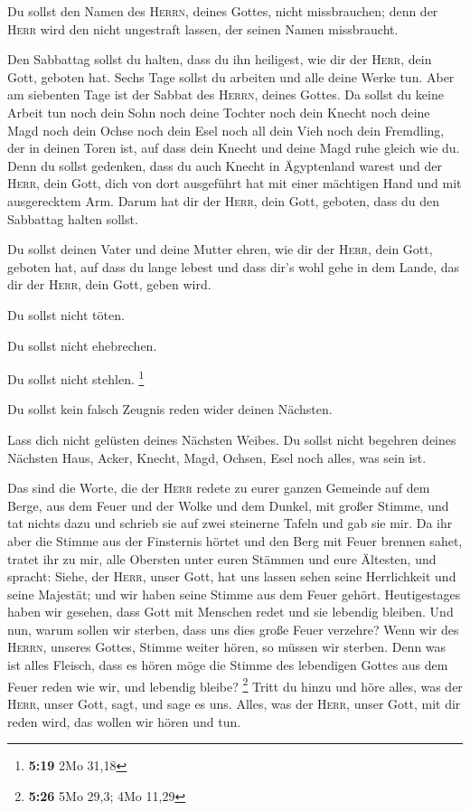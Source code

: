  Du sollst den Namen des \textsc{Herrn}, deines Gottes,
nicht missbrauchen; denn der \textsc{Herr} wird den nicht ungestraft
lassen, der seinen Namen missbraucht.

 Den Sabbattag sollst du halten, dass du ihn heiligest,
wie dir der \textsc{Herr}, dein Gott, geboten hat.  Sechs
Tage sollst du arbeiten und alle deine Werke tun.  Aber
am siebenten Tage ist der Sabbat des \textsc{Herrn}, deines Gottes. Da
sollst du keine Arbeit tun noch dein Sohn noch deine Tochter noch dein
Knecht noch deine Magd noch dein Ochse noch dein Esel noch all dein Vieh
noch dein Fremdling, der in deinen Toren ist, auf dass dein Knecht und
deine Magd ruhe gleich wie du.  Denn du sollst gedenken,
dass du auch Knecht in Ägyptenland warest und der \textsc{Herr}, dein
Gott, dich von dort ausgeführt hat mit einer mächtigen Hand und mit
ausgerecktem Arm. Darum hat dir der \textsc{Herr}, dein Gott, geboten,
dass du den Sabbattag halten sollst.

 Du sollst deinen Vater und deine Mutter ehren, wie dir
der \textsc{Herr}, dein Gott, geboten hat, auf dass du lange lebest und
dass dir's wohl gehe in dem Lande, das dir der \textsc{Herr}, dein Gott,
geben wird.

 Du sollst nicht töten.

 Du sollst nicht ehebrechen.

 Du sollst nicht stehlen. \footnote{\textbf{5:19} 2Mo
  31,18}

 Du sollst kein falsch Zeugnis reden wider deinen
Nächsten.

 Lass dich nicht gelüsten deines Nächsten Weibes. Du
sollst nicht begehren deines Nächsten Haus, Acker, Knecht, Magd, Ochsen,
Esel noch alles, was sein ist.

 Das sind die Worte, die der \textsc{Herr} redete zu
eurer ganzen Gemeinde auf dem Berge, aus dem Feuer und der Wolke und dem
Dunkel, mit großer Stimme, und tat nichts dazu und schrieb sie auf zwei
steinerne Tafeln und gab sie mir.  Da ihr aber die Stimme
aus der Finsternis hörtet und den Berg mit Feuer brennen sahet, tratet
ihr zu mir, alle Obersten unter euren Stämmen und eure Ältesten,
 und spracht: Siehe, der \textsc{Herr}, unser Gott, hat
uns lassen sehen seine Herrlichkeit und seine Majestät; und wir haben
seine Stimme aus dem Feuer gehört. Heutigestages haben wir gesehen, dass
Gott mit Menschen redet und sie lebendig bleiben.  Und
nun, warum sollen wir sterben, dass uns dies große Feuer verzehre? Wenn
wir des \textsc{Herrn}, unseres Gottes, Stimme weiter hören, so müssen
wir sterben.  Denn was ist alles Fleisch, dass es hören
möge die Stimme des lebendigen Gottes aus dem Feuer reden wie wir, und
lebendig bleibe? \footnote{\textbf{5:26} 5Mo 29,3; 4Mo 11,29}
 Tritt du hinzu und höre alles, was der \textsc{Herr},
unser Gott, sagt, und sage es uns. Alles, was der \textsc{Herr}, unser
Gott, mit dir reden wird, das wollen wir hören und tun.

